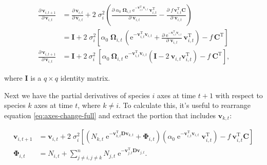 \begin{equation*}
\begin{split}
    \frac{ \partial \, \mathbf{v}_{i,t+1} }{ \partial \, \mathbf{v}_{i,t} } &=
        \frac{ \partial \, \mathbf{v}_{i,t} }{ \partial \, \mathbf{v}_{i,t} } +
        2 \; \sigma_i^2
        \left(
            \frac{ \partial \;
                \alpha_0 \; \bm{\Omega}_{i,t} \;
                    \textrm{e}^{-\mathbf{v}_{i,t}^{\textrm{T}} \mathbf{v}_{i,t}} \,
                    \mathbf{v}_{i,t}^{\textrm{T}}}{\partial \; \mathbf{v}_{i,t} } -
            \frac{ \partial \; f \, \mathbf{v}_{i,t}^{\textrm{T}} \mathbf{C}}{\partial \; \mathbf{v}_{i,t} }
        \right) \\
    &=
        \mathbf{I} +
        2 \; \sigma_i^2
        \left[
            \alpha_0 \; \bm{\Omega}_{i,t} \,
            \left(
                \textrm{e}^{-\mathbf{v}_{i,t}^{\textrm{T}} \mathbf{v}_{i,t}} +
                \frac{ \partial \;
                        \textrm{e}^{-\mathbf{v}_{i,t}^{\textrm{T}} \mathbf{v}_{i,t}}
                        }{\partial \; \mathbf{v}_{i,t} } \, \mathbf{v}_{i,t}^{\textrm{T}}
            \right) -
            f \, \mathbf{C}^{\textrm{T}}
            \right] \\[2ex]
    \frac{ \partial \, \mathbf{v}_{i,t+1} }{ \partial \, \mathbf{v}_{i,t} } &= \mathbf{I} + 2 ~ \sigma_i^2 ~
        \left[
            \alpha_0 ~ \bm{\Omega}_{i,t} ~ \textrm{e}^{ - \mathbf{v}_{i,t}^{\textrm{T}} \mathbf{v}_{i,t} }
            \left(
                \mathbf{I} - 2 ~ \mathbf{v}_{i,t} \mathbf{v}_{i,t}^{\textrm{T}}
            \right) -
            f \: \mathbf{C}^{\textrm{T}}
        \right]
    \textrm{,}
\end{split}
\end{equation*}

\noindent where $\mathbf{I}$ is a $q \times q$ identity matrix.


Next we have the partial derivatives of species $i$ axes at time $t+1$ with respect to 
species $k$ axes at time $t$, where $k \ne i$.
To calculate this, it's useful to rearrange equation \ref{eq:axes-change-full} and
extract the portion that includes $\mathbf{v}_{k,t}$:


\begin{equation*}
\begin{split}
    \mathbf{v}_{i,t+1} &= \mathbf{v}_{i,t} + 2 \; \sigma_i^2
    \left[
        \left(
            N_{k,t} \; \textrm{e}^{ -\mathbf{v}_{k,t}^{\textrm{T}} \mathbf{D}
            \mathbf{v}_{k,t} } + \mathbf{\Phi}_{i,t}
        \right)
        \left(
            \alpha_0 \; \textrm{e}^{-\mathbf{v}_{i,t}^{\textrm{T}}
            \mathbf{v}_{i,t} } \; \mathbf{v}_{i,t}^{\textrm{T}}
        \right)
        - f \: \mathbf{v}_{i,t}^{\textrm{T}} \mathbf{C}
    \right] \\
    \mathbf{\Phi}_{i,t} &= N_{i,t} + \sum_{j \ne i, j \ne k}^{n}{
        N_{j,t} \; \textrm{e}^{- \mathbf{v}_{j,t}^{\textrm{T}}
        \mathbf{D} \mathbf{v}_{j,t} } }
    \textrm{.}
\end{split}
\end{equation*}


